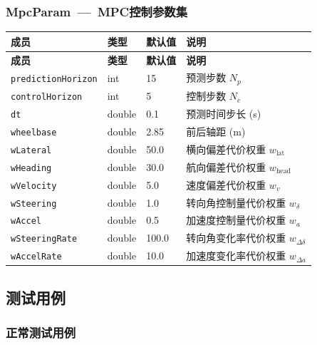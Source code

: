 \documentclass[a4paper,10pt]{article}
\begin{document}
\subsubsection{MpcParam~---~MPC控制参数集}
\begin{longtable}{|L{4cm}|C{1.5cm}|C{1.5cm}|L{8cm}|}
\hline
\textbf{成员} & \textbf{类型} & \textbf{默认值} & \textbf{说明} \\
\hline
\endfirsthead
\hline
\textbf{成员} & \textbf{类型} & \textbf{默认值} & \textbf{说明} \\
\hline
\endhead
\texttt{predictionHorizon} & int & 15 & 预测步数 $N_p$ \\
\hline
\texttt{controlHorizon} & int & 5 & 控制步数 $N_c$ \\
\hline
\texttt{dt} & double & 0.1 & 预测时间步长 (s) \\
\hline
\texttt{wheelbase} & double & 2.85 & 前后轴距 (m) \\
\hline
\texttt{wLateral} & double & 50.0 & 横向偏差代价权重 $w_{\text{lat}}$ \\
\hline
\texttt{wHeading} & double & 30.0 & 航向偏差代价权重 $w_{\text{head}}$ \\
\hline
\texttt{wVelocity} & double & 5.0 & 速度偏差代价权重 $w_v$ \\
\hline
\texttt{wSteering} & double & 1.0 & 转向角控制量代价权重 $w_\delta$ \\
\hline
\texttt{wAccel} & double & 0.5 & 加速度控制量代价权重 $w_a$ \\
\hline
\texttt{wSteeringRate} & double & 100.0 & 转向角变化率代价权重 $w_{\Delta\delta}$ \\
\hline
\texttt{wAccelRate} & double & 10.0 & 加速度变化率代价权重 $w_{\Delta a}$ \\
\hline
\end{longtable}

\subsection{测试用例}

\subsubsection{正常测试用例}
\end{document}
